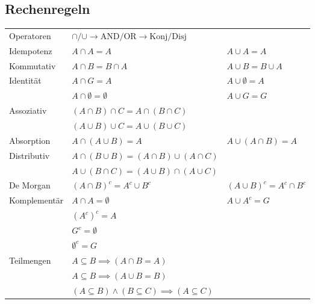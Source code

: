 \documentclass[8pt,landscape]{scrartcl}
\begin{document}
\begin{multicols}{3}
\subsection{Rechenregeln}
\begin{small}
\begin{tabular}{lll}
Operatoren    & $\cap/\cup \to \text{AND/OR} \to \text{Konj/Disj}$ &                  \\
Idempotenz    & $A \cap A = A$                          & $A \cup A = A$              \\
Kommutativ    & $A \cap B = B \cap A$                   & $A \cup B = B \cup A$       \\
Identit\"at   & $A \cap G = A$                          & $A \cup \emptyset = A$      \\
              & $A \cap \emptyset = \emptyset$          & $A \cup G = G$              \\
Assoziativ    & $(A \cap B) \cap C = A \cap (B \cap C)$ &                             \\
              & $(A \cup B) \cup C = A \cup (B \cup C)$ &                             \\
Absorption    & $A \cap (A \cup B) = A$                 & $A \cup (A \cap B) = A$     \\
Distributiv   & $A \cap (B \cup B) = (A \cap B) \cup (A \cap C)$ &                    \\
              & $A \cup (B \cap C) = (A \cup B) \cap (A \cup C)$                      \\
De Morgan     & $(A \cap B)^c = A^c \cup B^c$           & $(A \cup B)^c = A^c \cap B^c$ \\
Komplement\"ar& $A \cap A= \emptyset$                   & $A \cup A^c = G$            \\
              & $(A^c)^c = A$                           &                             \\
              & $G^c = \emptyset$                       &                             \\
              & $\emptyset^c = G$                       &                             \\
Teilmengen    & $A \subseteq B \implies (A \cap B = A)$ &                             \\
              & $A \subseteq B \implies (A \cup B = B)$ &                             \\
              & $(A \subseteq B ) \land (B \subseteq C) \implies (A \subseteq C)$ &   \\
\end{tabular}
\end{small}


\end{multicols}
\end{document}
